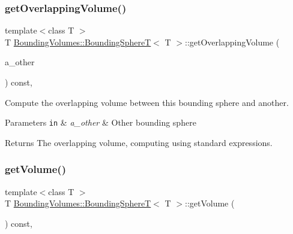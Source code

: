 \subsubsection{\texorpdfstring{get\+Overlapping\+Volume()}{getOverlappingVolume()}}
{\footnotesize\ttfamily template$<$class T $>$ \\
T \hyperlink{classBoundingVolumes_1_1BoundingSphereT}{Bounding\+Volumes\+::\+Bounding\+SphereT}$<$ T $>$\+::get\+Overlapping\+Volume (\begin{DoxyParamCaption}\item[{const \hyperlink{classBoundingVolumes_1_1BoundingSphereT}{Bounding\+SphereT}$<$ T $>$ \&}]{a\+\_\+other }\end{DoxyParamCaption}) const\hspace{0.3cm}{\ttfamily [inline]}, {\ttfamily [noexcept]}}



Compute the overlapping volume between this bounding sphere and another. 


\begin{DoxyParams}[1]{Parameters}
\mbox{\tt in}  & {\em a\+\_\+other} & Other bounding sphere \\
\hline
\end{DoxyParams}
\begin{DoxyReturn}{Returns}
The overlapping volume, computing using standard expressions. 
\end{DoxyReturn}
\mbox{\label{classBoundingVolumes_1_1BoundingSphereT_a44e0069495c19069fced07aab8e614c6}} 
\subsubsection{\texorpdfstring{get\+Volume()}{getVolume()}}
{\footnotesize\ttfamily template$<$class T $>$ \\
T \hyperlink{classBoundingVolumes_1_1BoundingSphereT}{Bounding\+Volumes\+::\+Bounding\+SphereT}$<$ T $>$\+::get\+Volume (\begin{DoxyParamCaption}{ }\end{DoxyParamCaption}) const\hspace{0.3cm}{\ttfamily [inline]}, {\ttfamily [noexcept]}}




